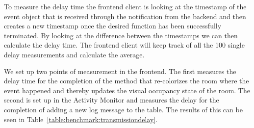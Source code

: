 To measure the delay time the frontend client is looking at the timestamp of the event object that is received through the notification from the backend and then creates a new timestamp once the desired function has been successfully terminated. By looking at the difference between the timestamps we can then calculate the delay time. The frontend client will keep track of all the 100 single delay measurements and calculate the average. 

We set up two points of measurement in the frontend. The first measures the delay time for the completion of the method that re-colorizes the room where the event happened and thereby updates the visual occupancy state of the room. The second is set up in the Activity Monitor and measures the delay for the completion of adding a new log message to the table.
The results of this can be seen in Table~\ref{table:benchmark:transmissiondelay}.

